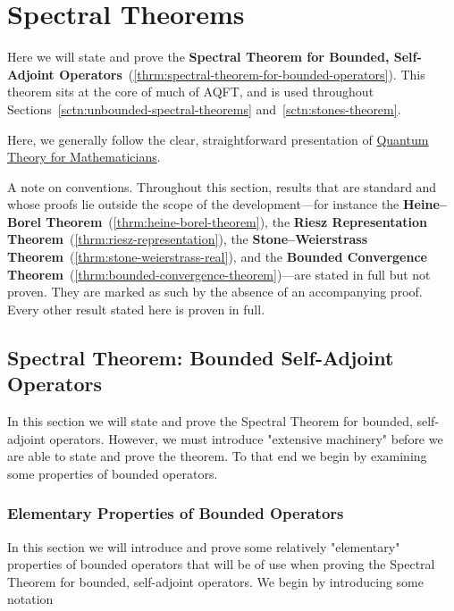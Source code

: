 \section{Spectral Theorems}\label{sctn:spectral-theorems}
Here we will state and prove the \textbf{Spectral Theorem for Bounded, Self-Adjoint Operators}~(\ref{thrm:spectral-theorem-for-bounded-operators}). This theorem sits at the core of much of AQFT, and is used throughout Sections~\ref{sctn:unbounded-spectral-theorems} and~\ref{sctn:stones-theorem}.

Here, we generally follow the clear, straightforward presentation of \href{https://doi.org/10.1007/978-1-4614-7116-5}{Quantum Theory for Mathematicians}.

A note on conventions. Throughout this section, results that are standard and whose proofs lie outside the scope of the development---for instance the \textbf{Heine–Borel Theorem}~(\ref{thrm:heine-borel-theorem}), the \textbf{Riesz Representation Theorem}~(\ref{thrm:riesz-representation}), the \textbf{Stone–Weierstrass Theorem}~(\ref{thrm:stone-weierstrass-real}), and the \textbf{Bounded Convergence Theorem}~(\ref{thrm:bounded-convergence-theorem})---are stated in full but not proven. They are marked as such by the absence of an accompanying proof. Every other result stated here is proven in full.

\subsection{Spectral Theorem: Bounded Self-Adjoint Operators}
In this section we will state and prove the Spectral Theorem for bounded, self-adjoint operators. However, we must introduce "extensive machinery" before we are able to state and prove the theorem. To that end we begin by examining some properties of bounded operators.

\subsubsection{Elementary Properties of Bounded Operators}
In this section we will introduce and prove some relatively "elementary" properties of bounded operators that will be of use when proving the Spectral Theorem for bounded, self-adjoint operators. We begin by introducing some notation

